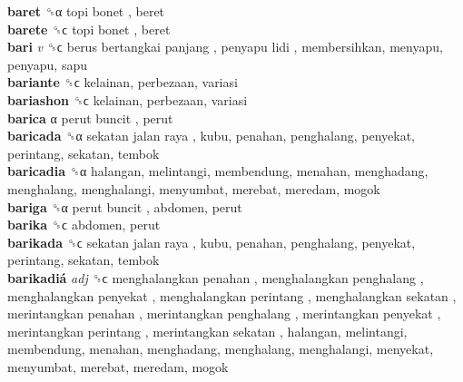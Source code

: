 \textbf{baret} ␝α   topi bonet , beret  \\
\textbf{barete} ␝ϲ   topi bonet , beret  \\
\textbf{bari} \emph{v}  ␝ϲ   berus bertangkai panjang ,  penyapu lidi , membersihkan, menyapu, penyapu, sapu  \\
\textbf{bariante} ␝ϲ  kelainan, perbezaan, variasi  \\
\textbf{bariashon} ␝ϲ  kelainan, perbezaan, variasi  \\
\textbf{barica} α   perut buncit , perut  \\
\textbf{baricada} ␝α   sekatan jalan raya , kubu, penahan, penghalang, penyekat, perintang, sekatan, tembok  \\
\textbf{baricadia} ␝α  halangan, melintangi, membendung, menahan, menghadang, menghalang, menghalangi, menyumbat, merebat, meredam, mogok  \\
\textbf{bariga} ␝α   perut buncit , abdomen, perut  \\
\textbf{barika} ␝ϲ  abdomen, perut  \\
\textbf{barikada} ␝ϲ   sekatan jalan raya , kubu, penahan, penghalang, penyekat, perintang, sekatan, tembok  \\
\textbf{barikadiá} \emph{adj}  ␝ϲ   menghalangkan penahan ,  menghalangkan penghalang ,  menghalangkan penyekat ,  menghalangkan perintang ,  menghalangkan sekatan ,  merintangkan penahan ,  merintangkan penghalang ,  merintangkan penyekat ,  merintangkan perintang ,  merintangkan sekatan , halangan, melintangi, membendung, menahan, menghadang, menghalang, menghalangi, menyekat, menyumbat, merebat, meredam, mogok  \\
